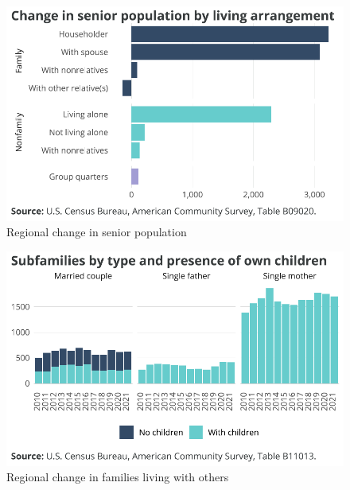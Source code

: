 \documentclass[
  letterpaper,
  DIV=11,
  numbers=noendperiod]{scrreprt}
\begin{document}
\begin{figure}[H]

{\centering \includegraphics{./part-3-1_files/figure-pdf/fig-seniors-1.pdf}

}

\caption{\label{fig-seniors}Regional change in senior population}

\end{figure}

\begin{figure}[H]

{\centering \includegraphics{./part-3-1_files/figure-pdf/fig-subfam-1.pdf}

}

\caption{\label{fig-subfam}Regional change in families living with
others}

\end{figure}
\end{document}
